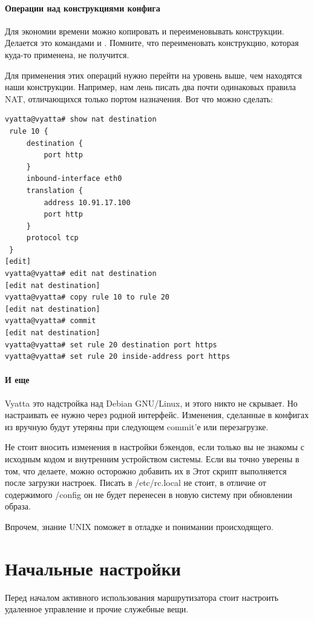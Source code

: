 \documentclass[a4paper,12pt, twoside, russian]{report}
\begin{document}
\subsubsection{Операции над конструкциями конфига}
Для экономии времени можно копировать и переименовывать конструкции. Делается это командами  и
. Помните, что переименовать конструкцию, которая куда-то применена, не получится.

Для применения этих операций нужно перейти на уровень выше, чем находятся наши конструкции. Например, нам лень
писать два почти одинаковых правила NAT, отличающихся только портом назначения. Вот что можно сделать:
\begin{verbatim}
vyatta@vyatta# show nat destination
 rule 10 {
     destination {
         port http
     }
     inbound-interface eth0
     translation {
         address 10.91.17.100
         port http
     }
     protocol tcp
 }
[edit]
vyatta@vyatta# edit nat destination
[edit nat destination]
vyatta@vyatta# copy rule 10 to rule 20
[edit nat destination]
vyatta@vyatta# commit
[edit nat destination]
vyatta@vyatta# set rule 20 destination port https
vyatta@vyatta# set rule 20 inside-address port https
\end{verbatim}

\subsubsection{И еще}
Vyatta это надстройка над Debian GNU/Linux, и этого никто не скрывает. Но настраивать ее нужно через родной
интерфейс. Изменения, сделанные в конфигах из  вручную будут утеряны при следующем commit'е или перезагрузке.

Не стоит вносить изменения в настройки бэкендов, если только вы не знакомы с исходным кодом и внутренним устройством системы.
Если вы точно уверены в том, что делаете, можно осторожно добавить их в 
Этот скрипт выполняется после загрузки настроек. Писать в /etc/rc.local не стоит, в отличие от содержимого /config он не будет
перенесен в новую систему при обновлении образа.

Впрочем, знание UNIX поможет в отладке и понимании происходящего.

\chapter{Начальные настройки}
Перед началом активного использования маршрутизатора стоит настроить удаленное управление и прочие служебные
вещи.
\end{document}
